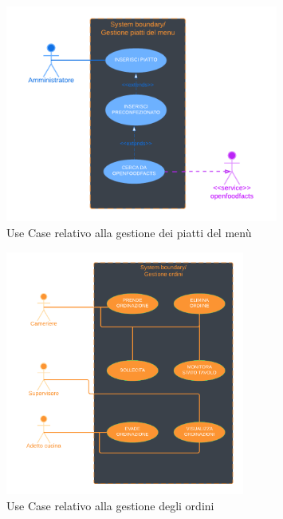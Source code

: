         \begin{figure}[H]
            \centering
            \includegraphics[width=0.8\textwidth]{assets/diagrammi/Use-Case/Gestione piatti.png}
            \caption{Use Case relativo alla gestione dei piatti del menù}
            \label{fig:ucdPlatesMgmt}
        \end{figure}

        \begin{figure}[H]
            \centering
            \includegraphics[width=0.7\textwidth]{assets/diagrammi/Use-Case/Gestione ordini.png}
            \caption{Use Case relativo alla gestione degli ordini}
            \label{fig:ucdOrderMgmt}
        \end{figure}
        
